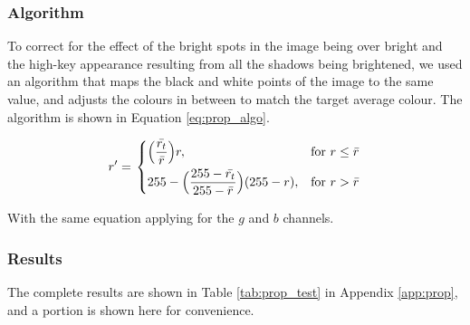 \subsubsection*{Algorithm}
To correct for the effect of the bright spots in the image being over bright and the high-key appearance resulting from all the shadows being brightened, we used an algorithm that maps the black and white points of the image to the same value, and adjusts the colours in between to match the target average colour. The algorithm is shown in Equation \ref{eq:prop_algo}.

\begin{equation} \label{eq:prop_algo}
  r' = \left.
  \begin{dcases}
    \displaystyle \Big(\frac{\bar{r_t}}{\bar{r}}\Big)r, & \text{for } r \leq \bar{r} \\
    \displaystyle 255 - 
    \Big(\frac{255 - \bar{r_t}}{255 - \bar{r}}\Big)(255 - r), & \text{for } r > \bar{r} \\
  \end{dcases}
  \right.
\end{equation}



With the same equation applying for the $g$ and $b$ channels.

\subsubsection*{Results}
The complete results are shown in Table \ref{tab:prop_test} in Appendix \ref{app:prop}, and a portion is shown here for convenience.

